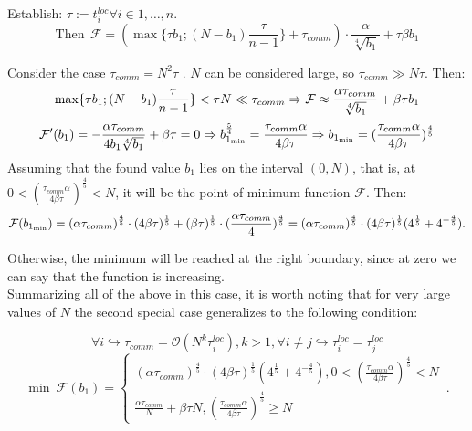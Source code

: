 \documentclass{article}
\begin{document}
\begin{itemize}

Establish: $\tau := t_i^{loc} \forall i \in {1,\ldots, n} $. 
\begin{equation}
        \text{Then} ~ ~\mathcal{F} = (\max\{\tau b_1; (N-b_1) \frac{\tau}{n-1}\} + \tau_{comm}) \cdot \frac{\alpha}{\sqrt[4]{b_1}}+\tau \beta b_1 
\end{equation}

Consider the case $\tau_{comm} = N^2 \tau$ . $N$ can be considered large, so $\tau_{comm} \gg N\tau$. Then:
\begin{equation}
    \notag
     \max \{\tau b_1; (N-b_1)\frac{\tau}{n-1}\} < \tau N \ll \tau_{comm}\Rightarrow \mathcal{F} \approx \frac{\alpha \tau_{comm}}{\sqrt[4]{b_1}} + \beta \tau b_1 
\end{equation}
\begin{equation}
    \notag
    \mathcal{F}' (b_1) = -\frac{\alpha \tau_{comm}}{4b_1\sqrt[4]{b_1}} + \beta \tau = 0 \Rightarrow b_{1_{\min}}^\frac{5}{4} = \frac{\tau _{comm}\alpha}{4\beta\tau}\Rightarrow b_{1_{\min}} = (\frac{\tau _{comm}\alpha}{4\beta\tau})^{\frac{4}{5}}
\end{equation}
Assuming that the found value $b_1$ lies on the interval $(0, N) $, that is, at $0 < (\frac{\tau _{comm}\alpha}{4\beta\tau})^{\frac{4}{5}} < N$, it will be the point of minimum function $\mathcal{F}$. Then:
\begin{equation}
    \notag
    \mathcal{F}(b_{1_{\min}}) = (\alpha \tau_{comm})^\frac{4}{5} \cdot (4\beta\tau)^\frac{1}{5} + (\beta \tau)^\frac{1}{5}\cdot(\frac{\alpha \tau_{comm}}{4})^\frac{4}{5} = (\alpha \tau_{comm})^\frac{4}{5}\cdot (4\beta\tau)^\frac{1}{5}(4^\frac{1}{5} + 4^{-\frac{4}{5}}).
\end{equation}
    
Otherwise, the minimum will be reached at the right boundary, since at zero we can say that the function is increasing.
    \\
Summarizing all of the above in this case, it is worth noting that for very large values of $N$ the second special case generalizes to the following condition:

\begin {equation} 
    \forall i  \hookrightarrow \tau_{comm} = \mathcal{O}( N^k \tau_i^{loc}), k >1 , \forall i\neq j\hookrightarrow \tau_i^{loc} = \tau_j^{loc}
\end {equation}
\begin {equation}          
\min ~ {\mathcal{F}}(b_1) = \begin{cases}
      (\alpha \tau_{comm})^\frac{4}{5}\cdot (4\beta\tau)^\frac{1}{5}(4^\frac{1}{5} + 4^{-\frac{4}{5}}),  0 < (\frac{\tau _{comm}\alpha}{4\beta\tau})^{\frac{4}{5}} < N\\
      \frac{\alpha\tau _{comm}}{N} + \beta \tau N , (\frac{\tau _{comm}\alpha}{4\beta\tau})^{\frac{4}{5}} \geq N
    \end{cases}\,.
\end {equation}
\end{itemize}
\end{document}
